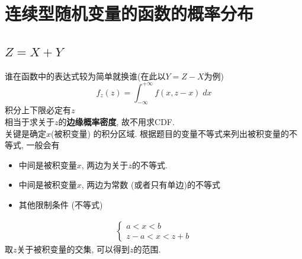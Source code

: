 \documentclass[a4paper]{report}
\begin{document}
\section{连续型随机变量的函数的概率分布}
\subsection{$Z=X+Y$}

谁在函数中的表达式较为简单就换谁(在此以$Y=Z-X$为例)
$$f_z(z)=\int_{-\infty}^{+\infty}f(x,z-x)\;dx$$
积分上下限必定有$z$\\
相当于求关于$z$的\textbf{边缘概率密度}, 故不用求CDF. \\
关键是确定$x$(被积变量) 的积分区域. 
根据题目的变量不等式来列出被积变量的不等式, 一般会有
\begin{itemize}
  \item 中间是被积变量$x$, 两边为关于$z$的不等式. 
  \item 中间是被积变量$x$, 两边为常数 (或者只有单边)的不等式
  \item 其他限制条件 (不等式)
\end{itemize}
\begin{align*}
  \begin{cases}
    a<x<b\\
    z-a<x<z+b
  \end{cases}
\end{align*}
取$z$关于被积变量的交集, 可以得到$z$的范围. 
\end{document}
